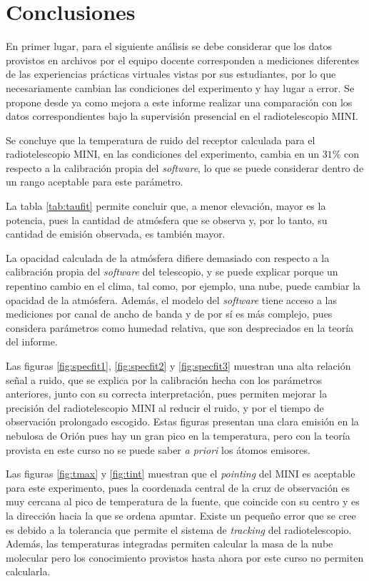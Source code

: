 \newpage

\section{Conclusiones}\label{sec:conclusiones}

En primer lugar, para el siguiente análisis se debe considerar que los datos provistos en archivos por el equipo docente corresponden a mediciones diferentes de las experiencias prácticas virtuales vistas por sus estudiantes, por lo que necesariamente cambian las condiciones del experimento y hay lugar a error. Se propone desde ya como mejora a este informe realizar una comparación con los datos correspondientes bajo la supervisión presencial en el radiotelescopio MINI.

Se concluye que la temperatura de ruido del receptor calculada para el radiotelescopio MINI, en las condiciones del experimento, cambia en un $31\%$ con respecto a la calibración propia del \textit{software}, lo que se puede considerar dentro de un rango aceptable para este parámetro.

La tabla \ref{tab:taufit} permite concluir que, a menor elevación, mayor es la potencia, pues la cantidad de atmósfera que se observa y, por lo tanto, su cantidad de emisión observada, es también mayor.

La opacidad calculada de la atmósfera difiere demasiado con respecto a la calibración propia del \textit{software} del telescopio, y se puede explicar porque un repentino cambio en el clima, tal como, por ejemplo, una nube, puede cambiar la opacidad de la atmósfera. Además, el modelo del \textit{software} tiene acceso a las mediciones por canal de ancho de banda y de por sí es más complejo, pues considera parámetros como humedad relativa, que son despreciados en la teoría del informe.

Las figuras \ref{fig:specfit1}, \ref{fig:specfit2} y \ref{fig:specfit3} muestran una alta relación señal a ruido, que se explica por la calibración hecha con los parámetros anteriores, junto con su correcta interpretación, pues permiten mejorar la precisión del radiotelescopio MINI al reducir el ruido, y por el tiempo de observación prolongado escogido. Estas figuras presentan una clara emisión en la nebulosa de Orión pues hay un gran pico en la temperatura, pero con la teoría provista en este curso no se puede saber \textit{a priori} los átomos emisores.

Las figuras \ref{fig:tmax} y \ref{fig:tint} muestran que el \textit{pointing} del MINI es aceptable para este experimento, pues la coordenada central de la cruz de observación es muy cercana al pico de temperatura de la fuente, que coincide con su centro y es la dirección hacia la que se ordena apuntar. Existe un pequeño error que se cree es debido a la tolerancia que permite el sistema de \textit{tracking} del radiotelescopio. Además, las temperaturas integradas permiten calcular la masa de la nube molecular pero los conocimiento provistos hasta ahora por este curso no permiten calcularla.

